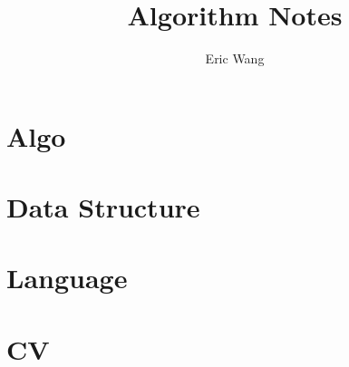 \documentclass{book}
\begin{document}
\title{Algorithm Notes}
\author{Eric Wang}
\maketitle
\newpage
\tableofcontents
\newpage

\part{Algo}




\part{Data Structure}




\part{Language}


\part{CV}


\end{document}
